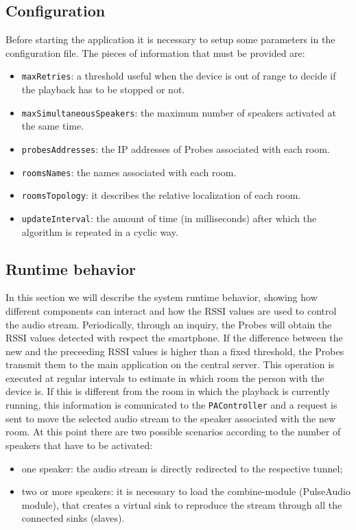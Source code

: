\documentclass[conference]{IEEEtran}
\begin{document}
\subsection{Configuration}
Before starting the application it is necessary to setup some parameters in the configuration file. The pieces of information that must be provided are:
\begin{itemize}
\item \texttt{maxRetries}: a threshold useful when the device is out of range to decide if the playback has to be stopped or not.
\item \texttt{maxSimultaneousSpeakers}: the maximum number of speakers activated at the same time.
\item \texttt{probesAddresses}: the IP addresses of Probes associated with each room.
\item \texttt{roomsNames}: the names associated with each room.
\item \texttt{roomsTopology}: it describes the relative localization of each room. %
\item \texttt{updateInterval}: the amount of time (in milliseconds) after which the algorithm is repeated in a cyclic way.
\end{itemize}

\subsection{Runtime behavior}
In this section we will describe the system runtime behavior, showing how different components can interact and how the RSSI values are used to control the audio stream.
Periodically, through an inquiry, the Probes will obtain the RSSI values detected with respect the smartphone. If the difference between the new and the preceeding RSSI values is higher than a fixed threshold, the Probes transmit them to the main application on the central server. This operation is executed at regular intervals to estimate in which room the person with the device is. If this is different from the room in which the playback is currently running, this information is comunicated to the \texttt{PAController} and a request is sent to move the selected audio stream to the speaker associated with the new room. At this point there are two possible scenarios according to the number of speakers that have to be activated:
\begin{itemize}
	\item one speaker: the audio stream is directly redirected to the respective tunnel;
	\item two or more speakers: it is necessary to load the combine-module (PulseAudio module), that creates a virtual sink to reproduce the stream through all the connected sinks (slaves).
\end{itemize}
\end{document}
